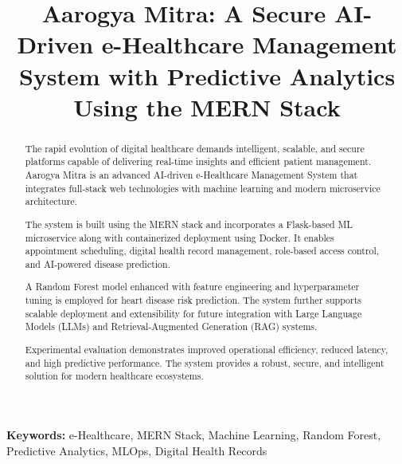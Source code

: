 \documentclass[conference]{IEEEtran}
\begin{document}
\thispagestyle{fancy}
\title{Aarogya Mitra: A Secure AI-Driven e-Healthcare Management System with Predictive Analytics Using the MERN Stack}

\author{
}

\maketitle
\thispagestyle{fancy}
\begin{abstract}
The rapid evolution of digital healthcare demands intelligent, scalable, and secure platforms capable of delivering real-time insights and efficient patient management. Aarogya Mitra is an advanced AI-driven e-Healthcare Management System that integrates full-stack web technologies with machine learning and modern microservice architecture.

The system is built using the MERN stack and incorporates a Flask-based ML microservice along with containerized deployment using Docker. It enables appointment scheduling, digital health record management, role-based access control, and AI-powered disease prediction.

A Random Forest model enhanced with feature engineering and hyperparameter tuning is employed for heart disease risk prediction. The system further supports scalable deployment and extensibility for future integration with Large Language Models (LLMs) and Retrieval-Augmented Generation (RAG) systems.

Experimental evaluation demonstrates improved operational efficiency, reduced latency, and high predictive performance. The system provides a robust, secure, and intelligent solution for modern healthcare ecosystems.
\end{abstract}

\textbf{Keywords:} e-Healthcare, MERN Stack, Machine Learning, Random Forest, Predictive Analytics, MLOps, Digital Health Records
 
\end{document}
